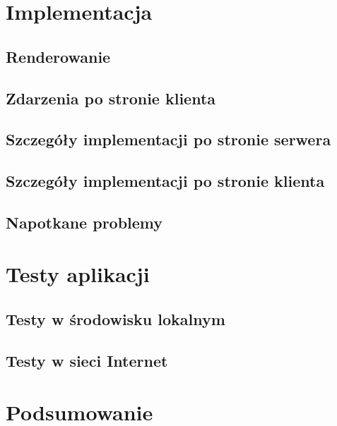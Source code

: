 \documentclass[polish]{inz}
\begin{document}
\chapter{Implementacja}
\section{Renderowanie}

\section{Zdarzenia po stronie klienta}


\section{Szczegóły implementacji po stronie serwera}
\label{sec:implementation_server}


\section{Szczegóły implementacji po stronie klienta}


\label{sec:napotkane_problemy}
\section{Napotkane problemy}


\chapter{Testy aplikacji}


\section{Testy w środowisku lokalnym}


\section{Testy w sieci Internet}


\chapter{Podsumowanie}



\printindex
\end{document}
